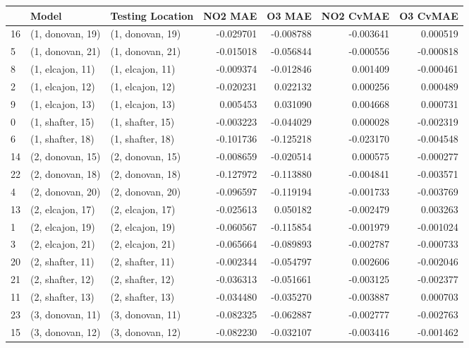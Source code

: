 \begin{tabular}{lllrrrr}
\toprule
{} &             Model &  Testing Location &   NO2 MAE &    O3 MAE &  NO2 CvMAE &  O3 CvMAE \\
\midrule
16 &  (1, donovan, 19) &  (1, donovan, 19) & -0.029701 & -0.008788 &  -0.003641 &  0.000519 \\
5  &  (1, donovan, 21) &  (1, donovan, 21) & -0.015018 & -0.056844 &  -0.000556 & -0.000818 \\
8  &  (1, elcajon, 11) &  (1, elcajon, 11) & -0.009374 & -0.012846 &   0.001409 & -0.000461 \\
2  &  (1, elcajon, 12) &  (1, elcajon, 12) & -0.020231 &  0.022132 &   0.000256 &  0.000489 \\
9  &  (1, elcajon, 13) &  (1, elcajon, 13) &  0.005453 &  0.031090 &   0.004668 &  0.000731 \\
0  &  (1, shafter, 15) &  (1, shafter, 15) & -0.003223 & -0.044029 &   0.000028 & -0.002319 \\
6  &  (1, shafter, 18) &  (1, shafter, 18) & -0.101736 & -0.125218 &  -0.023170 & -0.004548 \\
14 &  (2, donovan, 15) &  (2, donovan, 15) & -0.008659 & -0.020514 &   0.000575 & -0.000277 \\
22 &  (2, donovan, 18) &  (2, donovan, 18) & -0.127972 & -0.113880 &  -0.004841 & -0.003571 \\
4  &  (2, donovan, 20) &  (2, donovan, 20) & -0.096597 & -0.119194 &  -0.001733 & -0.003769 \\
13 &  (2, elcajon, 17) &  (2, elcajon, 17) & -0.025613 &  0.050182 &  -0.002479 &  0.003263 \\
1  &  (2, elcajon, 19) &  (2, elcajon, 19) & -0.060567 & -0.115854 &  -0.001979 & -0.001024 \\
3  &  (2, elcajon, 21) &  (2, elcajon, 21) & -0.065664 & -0.089893 &  -0.002787 & -0.000733 \\
20 &  (2, shafter, 11) &  (2, shafter, 11) & -0.002344 & -0.054797 &   0.002606 & -0.002046 \\
21 &  (2, shafter, 12) &  (2, shafter, 12) & -0.036313 & -0.051661 &  -0.003125 & -0.002377 \\
11 &  (2, shafter, 13) &  (2, shafter, 13) & -0.034480 & -0.035270 &  -0.003887 &  0.000703 \\
23 &  (3, donovan, 11) &  (3, donovan, 11) & -0.082325 & -0.062887 &  -0.002777 & -0.002763 \\
15 &  (3, donovan, 12) &  (3, donovan, 12) & -0.082230 & -0.032107 &  -0.003416 & -0.001462 \\

\end{tabular}
